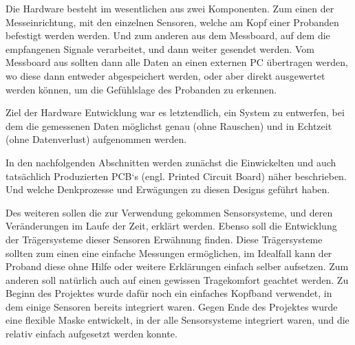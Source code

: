 

Die Hardware besteht im wesentlichen aus zwei Komponenten. Zum einen der Messeinrichtung, mit den einzelnen Sensoren, welche am Kopf einer Probanden befestigt werden werden. Und zum anderen aus dem Messboard, auf dem die empfangenen Signale verarbeitet, und dann weiter gesendet werden. Vom Messboard aus sollten dann alle Daten an einen externen PC übertragen werden, wo diese dann entweder abgespeichert werden, oder aber direkt ausgewertet werden können, um die Gefühlslage des Probanden zu erkennen.

Ziel der Hardware Entwicklung war es letztendlich, ein System zu entwerfen, bei dem die gemessenen Daten möglichst genau (ohne Rauschen) und in Echtzeit (ohne Datenverlust) aufgenommen werden.

In den nachfolgenden Abschnitten werden zunächst die Einwickelten und auch tatsächlich Produzierten PCB‘s (engl. Printed Circuit Board) näher beschrieben. Und welche Denkprozesse und Erwägungen zu diesen Designs geführt haben.

Des weiteren sollen die zur Verwendung gekommen Sensorsysteme, und deren Veränderungen im Laufe der Zeit, erklärt werden. Ebenso soll die Entwicklung der Trägersysteme dieser Sensoren Erwähnung finden. Diese Trägersysteme sollten zum einen eine einfache Messungen ermöglichen, im Idealfall kann der Proband diese ohne Hilfe oder weitere Erklärungen einfach selber aufsetzen. Zum anderen soll natürlich auch auf einen gewissen Tragekomfort geachtet werden. Zu Beginn des Projektes wurde dafür noch ein einfaches Kopfband verwendet, in dem einige Sensoren bereits integriert waren. Gegen Ende des Projektes wurde eine flexible Maske entwickelt, in der alle Sensorsysteme integriert waren, und die relativ einfach aufgesetzt werden konnte.

%

%









